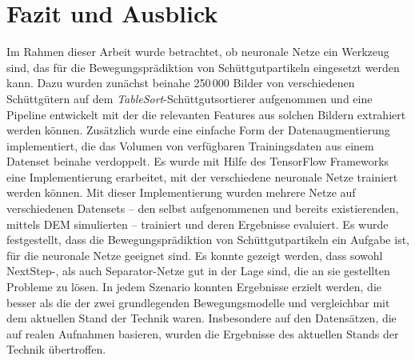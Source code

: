 \chapter{Fazit und Ausblick}
\label{cap:fazit}

Im Rahmen dieser Arbeit wurde betrachtet, ob neuronale Netze ein Werkzeug sind, das für die Bewegungsprädiktion von Schüttgutpartikeln eingesetzt werden kann.
Dazu wurden zunächst beinahe 250\,000 Bilder von verschiedenen Schüttgütern auf dem \textit{TableSort}-Schüttgutsortierer aufgenommen 
und eine Pipeline entwickelt mit der die relevanten Features aus solchen Bildern extrahiert werden können.
Zusätzlich wurde eine einfache Form der Datenaugmentierung implementiert, die das Volumen von verfügbaren Trainingsdaten aus einem Datenset beinahe verdoppelt.
Es wurde mit Hilfe des TensorFlow Frameworks eine Implementierung erarbeitet, mit der verschiedene neuronale Netze trainiert werden können.
Mit dieser Implementierung wurden mehrere Netze auf verschiedenen Datensets -- den selbst aufgenommenen und bereits existierenden, mittels DEM simulierten -- trainiert und deren Ergebnisse evaluiert.
Es wurde festgestellt, dass die Bewegungsprädiktion von Schüttgutpartikeln ein Aufgabe ist, für die neuronale Netze geeignet sind.
Es konnte gezeigt werden, dass sowohl NextStep-, als auch Separator-Netze gut in der Lage sind, die an sie gestellten Probleme zu lösen.
In jedem Szenario konnten Ergebnisse erzielt werden, die besser als die der zwei grundlegenden Bewegungsmodelle
und vergleichbar mit dem aktuellen Stand der Technik waren.
Insbesondere auf den Datensätzen, die auf realen Aufnahmen basieren, wurden die Ergebnisse des aktuellen Stands der Technik übertroffen.






